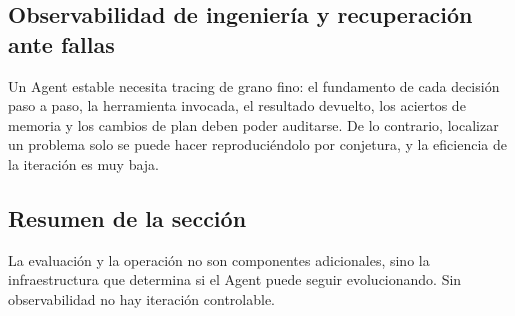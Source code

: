 \subsection{Observabilidad de ingeniería y recuperación ante fallas}
Un Agent estable necesita tracing de grano fino: el fundamento de cada decisión paso a paso, la herramienta invocada, el resultado devuelto, los aciertos de memoria y los cambios de plan deben poder auditarse. De lo contrario, localizar un problema solo se puede hacer reproduciéndolo por conjetura, y la eficiencia de la iteración es muy baja.

\subsection{Resumen de la sección}
La evaluación y la operación no son componentes adicionales, sino la infraestructura que determina si el Agent puede seguir evolucionando. Sin observabilidad no hay iteración controlable.

